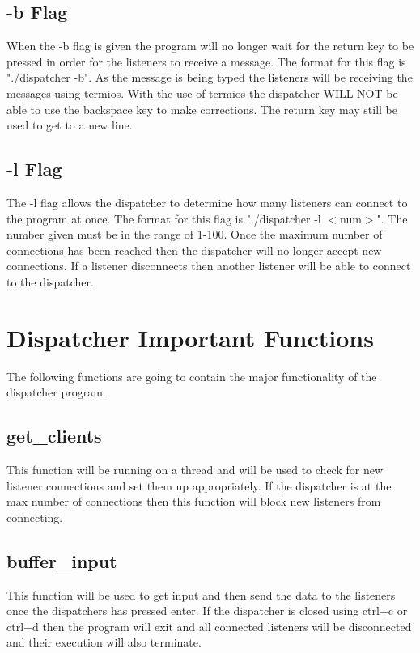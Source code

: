 \documentclass{article}
\begin{document}
\subsection{-b Flag}
When the -b flag is given the program will no longer wait for the return key to be pressed in order for the listeners to receive a message. The format for this flag is "./dispatcher -b". As the message is being typed the listeners will be receiving the messages using termios. With the use of termios the dispatcher WILL NOT be able to use the backspace key to make corrections. The return key may still be used to get to a new line.

\subsection{-l Flag}
The -l flag allows the dispatcher to determine how many listeners can connect to the program at once. The format for this flag is "./dispatcher -l $<$num$>$". The number given must be in the range of 1-100. Once the maximum number of connections has been reached then the dispatcher will no longer accept new connections. If a listener disconnects then another listener will be able to connect to the dispatcher.

\section{Dispatcher Important Functions}
The following functions are going to contain the major functionality of the dispatcher program.

\subsection{get\_clients}
This function will be running on a thread and will be used to check for new listener connections and set them up appropriately. If the dispatcher is at the max number of connections then this function will block new listeners from connecting.

\subsection{buffer\_input}
This function will be used to get input and then send the data to the listeners once the dispatchers has pressed enter. If the dispatcher is closed using ctrl+c or ctrl+d then the program will exit and all connected listeners will be disconnected and their execution will also terminate.
\end{document}
